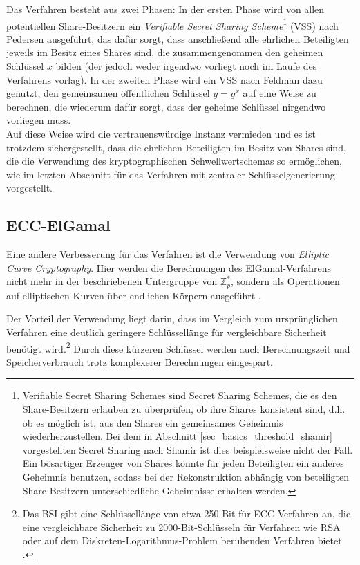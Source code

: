 Das Verfahren besteht aus zwei Phasen: In der ersten Phase wird von allen potentiellen Share-Besitzern ein \textit{Verifiable Secret Sharing Scheme}\footnote{
  Verifiable Secret Sharing Schemes sind Secret Sharing Schemes, die es den Share-Besitzern erlauben zu überprüfen, ob ihre Shares konsistent sind, d.h. ob es möglich ist, aus den Shares ein gemeinsames Geheimnis wiederherzustellen. Bei dem in Abschnitt \ref{sec_basics_threshold_shamir} vorgestellten Secret Sharing nach Shamir ist dies beispielsweise nicht der Fall. Ein bösartiger Erzeuger von Shares könnte für jeden Beteiligten ein anderes Geheimnis benutzen, sodass bei der Rekonstruktion abhängig von beteiligten Share-Besitzern unterschiedliche Geheimnisse erhalten werden.
} (VSS) nach Pedersen ausgeführt, das dafür sorgt, dass anschließend alle ehrlichen Beteiligten jeweils im Besitz eines Shares sind, die zusammengenommen den geheimen Schlüssel \(x\) bilden (der jedoch weder irgendwo vorliegt noch im Laufe des Verfahrens vorlag). In der zweiten Phase wird ein VSS nach Feldman dazu genutzt, den gemeinsamen öffentlichen Schlüssel \(y = g^x\) auf eine Weise zu berechnen, die wiederum dafür sorgt, dass der geheime Schlüssel nirgendwo vorliegen muss.\\
Auf diese Weise wird die vertrauenswürdige Instanz vermieden und es ist trotzdem sichergestellt, dass die ehrlichen Beteiligten im Besitz von Shares sind, die die Verwendung des kryptographischen Schwellwertschemas so ermöglichen, wie im letzten Abschnitt für das Verfahren mit zentraler Schlüsselgenerierung vorgestellt.

\subsection{ECC-ElGamal}

\label{sec_state_threshold_ecc}

Eine andere Verbesserung für das Verfahren ist die Verwendung von \textit{Elliptic Curve Cryptography}. Hier werden die Berechnungen des ElGamal-Verfahrens nicht mehr in der beschriebenen Untergruppe von \(\mathbb{Z}_p^*\), sondern als Operationen auf elliptischen Kurven über endlichen Körpern ausgeführt \cite{koblitz1987elliptic}.

Der Vorteil der Verwendung liegt darin, dass im Vergleich zum ursprünglichen Verfahren eine deutlich geringere Schlüssellänge für vergleichbare Sicherheit benötigt wird.\footnote{
  Das BSI gibt eine Schlüssellänge von etwa 250 Bit für ECC-Verfahren an, die eine vergleichbare Sicherheit zu 2000-Bit-Schlüsseln für Verfahren wie RSA oder auf dem Diskreten-Logarithmus-Problem beruhenden Verfahren bietet \cite{bsi2018}.
} Durch diese kürzeren Schlüssel werden auch Berechnungszeit und Speicherverbrauch trotz komplexerer Berechnungen eingespart.

